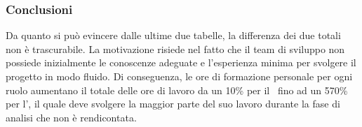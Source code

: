 	\subsubsection{Conclusioni} %
	Da quanto si può evincere dalle ultime due tabelle, la differenza dei due totali non è trascurabile.
	La motivazione risiede nel fatto che il team di sviluppo non possiede inizialmente le conoscenze adeguate
	e l'esperienza minima per svolgere il progetto in modo fluido. Di conseguenza, le ore di formazione personale
	per ogni ruolo aumentano il totale delle ore di lavoro da un 10\% per il \Progr\ fino ad un 570\% per l'\Ana,
	il quale deve svolgere la maggior parte del suo lavoro durante la fase di analisi che non è rendicontata.
